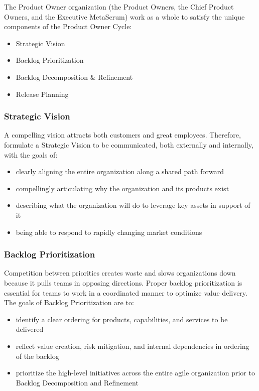 \documentclass[12pt,a4paper,parskip=full]{scrartcl}
\begin{document}
The Product Owner organization (the Product Owners, the Chief Product
Owners, and the Executive MetaScrum) work as a whole to satisfy the
unique components of the Product Owner Cycle:

\begin{itemize}
\itemsep1pt\parskip0pt
\item
  Strategic Vision
\item
  Backlog Prioritization
\item
  Backlog Decomposition \& Refinement
\item
  Release Planning
\end{itemize}

\subsubsection{Strategic Vision}\label{strategic-vision}

A compelling vision attracts both customers and great employees.
Therefore, formulate a Strategic Vision to be communicated, both
externally and internally, with the goals of:

\begin{itemize}
\itemsep1pt\parskip0pt
\item
  clearly aligning the entire organization along a shared path forward
\item
  compellingly articulating why the organization and its products exist
\item
  describing what the organization will do to leverage key assets in
  support of it
\item
  being able to respond to rapidly changing market conditions
\end{itemize}

\subsubsection{Backlog Prioritization}\label{backlog-prioritization}

Competition between priorities creates waste and slows organizations
down because it pulls teams in opposing directions. Proper backlog
prioritization is essential for teams to work in a coordinated manner to
optimize value delivery. The goals of Backlog Prioritization are to:

\begin{itemize}
\itemsep1pt\parskip0pt
\item
  identify a clear ordering for products, capabilities, and services to
  be delivered
\item
  reflect value creation, risk mitigation, and internal dependencies in
  ordering of the backlog
\item
  prioritize the high-level initiatives across the entire agile
  organization prior to Backlog Decomposition and Refinement
\end{itemize}
\end{document}
